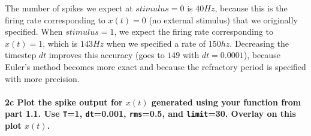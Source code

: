 \documentclass{article}
\begin{document}
    The number of spikes we expect at $stimulus=0$ is $40Hz$, because this
is the firing rate corresponding to $x(t)=0$ (no external stimulus) that
we originally specified. When $stimulus = 1$, we expect the firing rate
corresponding to $x(t)=1$, which is $143Hz$ when we specified a rate of
$150hz$. Decreasing the timestep $dt$ improves this accuracy (goes to
$149$ with $dt=0.0001$), because Euler's method becomes more exact and
because the refractory period is specified with more precision.

    \paragraph{2c Plot the spike output for $x(t)$ generated using your
function from part 1.1. Use \texttt{T}=1, \texttt{dt}=0.001,
\texttt{rms}=0.5, and \texttt{limit}=30. Overlay on this plot
$x(t)$.}\label{c-plot-the-spike-output-for-xt-generated-using-your-function-from-part-1.1.-use-t1-dt0.001-rms0.5-and-limit30.-overlay-on-this-plot-xt.}
\end{document}
